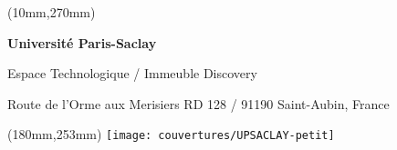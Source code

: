 \begin{textblock*}{161mm}(10mm,270mm)

\color{bordeau}
{\bf\noindent Université Paris-Saclay	         }

\noindent Espace Technologique / Immeuble Discovery

\noindent Route de l’Orme aux Merisiers RD 128 / 91190 Saint-Aubin, France
\end{textblock*}


\begin{textblock*}{20mm}(180mm,253mm)
\texttt{[image: couvertures/UPSACLAY-petit]}
\end{textblock*}


